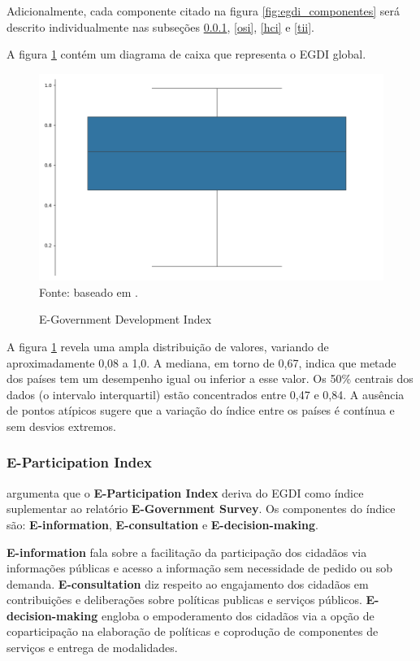 Adicionalmente, cada componente citado na figura \ref{fig:egdi_componentes} será descrito individualmente nas subseções \ref{epart}, \ref{osi}, \ref{hci} e \ref{tii}.

A figura \ref{fig:boxplot_egov_global} contém um diagrama de caixa que representa o EGDI global.

\begin{figure}[H]
	\centering
	\caption{E-Government Development Index}
	\includegraphics[width=1\linewidth]{figuras/egdi/boxplot_egov_global.png}
	\label{fig:boxplot_egov_global}
	\footnotesize{Fonte: baseado em \cite{ONU_edgi_mapa}.}
\end{figure}

A figura \ref{fig:boxplot_egov_global} revela uma ampla distribuição de valores, variando de aproximadamente 0,08 a 1,0. A mediana, em torno de 0,67, indica que metade dos países tem um desempenho igual ou inferior a esse valor. Os 50\% centrais dos dados (o intervalo interquartil) estão concentrados entre 0,47 e 0,84. A ausência de pontos atípicos sugere que a variação do índice entre os países é contínua e sem desvios extremos.

\subsubsection{E-Participation Index}
\label{epart}

\cite{ONU_egdi} argumenta que o \textbf{E-Participation Index} deriva do EGDI como índice suplementar ao relatório \textbf{E-Government Survey}. Os componentes do índice são: \textbf{E-information}, \textbf{E-consultation} e \textbf{E-decision-making}. 

\textbf{E-information} fala sobre a facilitação da participação dos cidadãos via informações públicas e acesso a informação sem necessidade de pedido ou sob demanda. \textbf{E-consultation} diz respeito ao engajamento dos cidadãos em contribuições e deliberações sobre políticas publicas e serviços públicos. \textbf{E-decision-making} engloba o empoderamento dos cidadãos via a opção de coparticipação na elaboração de políticas e coprodução de componentes de serviços e entrega de modalidades.

